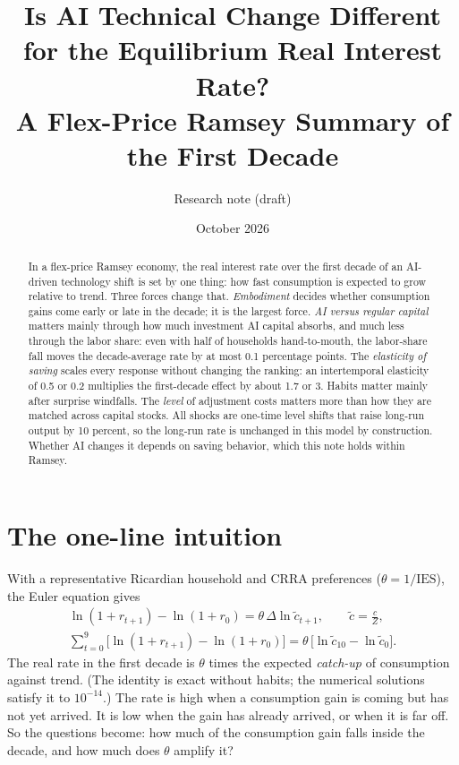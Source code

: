 \documentclass[11pt]{article}
\title{Is AI Technical Change Different for the Equilibrium Real Interest Rate?\\
A Flex-Price Ramsey Summary of the First Decade}
\author{Research note (draft)}
\date{October 2026}
\begin{document}
\maketitle

\begin{abstract}
\noindent In a flex-price Ramsey economy, the real interest rate over the first decade of an
AI-driven technology shift is set by one thing: how fast consumption is expected to grow relative to trend.
Three forces change that. \emph{Embodiment} decides whether consumption gains come early or late in the
decade; it is the largest force. \emph{AI versus regular capital} matters mainly through how much
investment AI capital absorbs, and much less through the labor share: even with half of households
hand-to-mouth, the labor-share fall moves the decade-average rate by at most 0.1 percentage points. The
\emph{elasticity of saving} scales every response without changing the ranking:
an intertemporal elasticity of 0.5 or 0.2 multiplies the first-decade effect by about 1.7 or 3.
Habits matter mainly after surprise windfalls. The \emph{level} of adjustment costs matters
more than how they are matched across capital stocks. All shocks are one-time level shifts that raise
long-run output by 10 percent, so the long-run rate is unchanged in this model by construction. Whether AI
changes it depends on saving behavior, which this note holds within Ramsey.
\end{abstract}

\section{The one-line intuition}

With a representative Ricardian household and CRRA preferences ($\theta=1/\text{IES}$), the
Euler equation gives
\begin{gather}
\ln(1+r_{t+1})-\ln(1+r_0)=\theta\,\Delta\ln \tilde c_{t+1},\qquad \tilde c=\frac{c}{Z},\nonumber\\
\sum_{t=0}^{9}\big[\ln(1+r_{t+1})-\ln(1+r_0)\big]=\theta\,\big[\ln\tilde c_{10}-\ln\tilde c_{0}\big].
\label{eq:id}
\end{gather}
The real rate in the first decade is $\theta$ times the expected \emph{catch-up} of consumption
against trend. (The identity is exact without habits; the numerical solutions satisfy it to $10^{-14}$.) The
rate is high when a consumption gain is coming but has not yet arrived. It is low when the gain has already
arrived, or when it is far off. So the questions become: how much of the consumption gain falls inside the
decade, and how much does $\theta$ amplify it?
\end{document}

